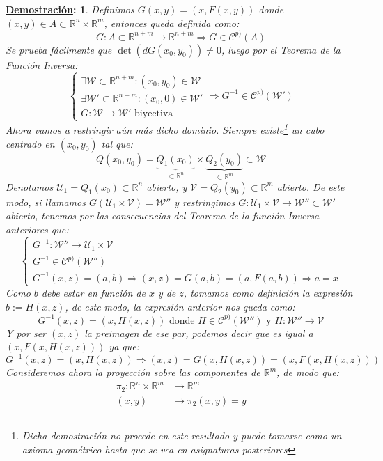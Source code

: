 \documentclass[10pt,a4paper,openright]{book}
\theoremstyle{break}
\newtheorem*{demo}{\underline{Demostración}:}
\begin{document}
\begin{demo}
Definimos $G(x,y) = (x, F(x,y))$ donde $(x,y) \in A \subset \mathbb{R}^n \times \mathbb{R}^m$, entonces queda definida como:
$$G : A \subset \mathbb{R}^{n+m} \to \mathbb{R}^{n+m} \Rightarrow G \in \mathcal{C}^{p)}(A)$$
Se prueba fácilmente que $\det(dG(x_0, y_0)) \neq 0$, luego por el Teorema de la Función Inversa:
$$\begin{cases} \exists \mathcal{W} \subset \mathbb{R}^{n+m} : (x_0, y_0) \in \mathcal{W} \\ \exists \mathcal{W}' \subset \mathbb{R}^{n+m} : (x_0, 0)\in \mathcal{W}' \\
G: \mathcal{W} \to \mathcal{W}' \mbox{ biyectiva } \end{cases} \Rightarrow G^{-1} \in \mathcal{C}^{p)}(\mathcal{W}')$$
Ahora vamos a restringir aún más dicho dominio. Siempre existe\footnote{Dicha demostración no procede en este resultado y puede tomarse como un axioma geométrico hasta que se vea en asignaturas posteriores} un cubo centrado en $(x_0, y_0)$ tal que:
$$Q(x_0, y_0) = \underbrace{Q_1 (x_0)}_{\subset \mathbb{R}^n} \times \underbrace{Q_2 (y_0)}_{\subset \mathbb{R}^m} \subset \mathcal{W}$$
Denotamos $\mathcal{U}_1 = Q_1 (x_0) \subset \mathbb{R}^n $ abierto, y $\mathcal{V} = Q_2 (y_0) \subset \mathbb{R}^m $ abierto. De este modo, si llamamos $G(\mathcal{U}_1 \times \mathcal{V}) = \mathcal{W}''$ y restringimos $G: \mathcal{U}_1 \times \mathcal{V} \to \mathcal{W}''\subset \mathcal{W}'$ abierto, tenemos por las consecuencias del Teorema de la función Inversa anteriores que:
$$\begin{cases} G^{-1}: \mathcal{W}'' \to \mathcal{U}_1 \times \mathcal{V} \\ G^{-1} \in \mathcal{C}^{p)}(\mathcal{W}'') \\ G^{-1}(x,z) = (a,b) \Rightarrow (x,z) = G(a,b) = (a, F(a,b)) \Rightarrow a = x \end{cases}$$
Como $b$ debe estar en función de $x$ y de $z$, tomamos como definición la expresión $b := H(x,z)$, de este modo, la expresión anterior nos queda como:
$$G^{-1}(x,z) = (x, H(x,z)) \text{ donde } H \in \mathcal{C}^{p)}(\mathcal{W}'') \text{ y } H: \mathcal{W}'' \to \mathcal{V}$$
Y por ser $(x,z)$ la preimagen de ese par, podemos decir que es igual a $(x, F(x, H(x,z)))$ ya que:
$$G^{-1} (x,z) = (x, H(x,z)) \Rightarrow (x,z) = G(x, H(x,z)) = (x, F(x, H(x,z)))$$
Consideremos ahora la proyección sobre las componentes de $\mathbb{R}^m$, de modo que:
\begin{align*}
\pi_2 : \mathbb{R}^n \times \mathbb{R}^m &\to \mathbb{R}^m \\ (x,y) &\to \pi_2 (x,y) = y

\end{align*}
\end{demo}
\end{document}
